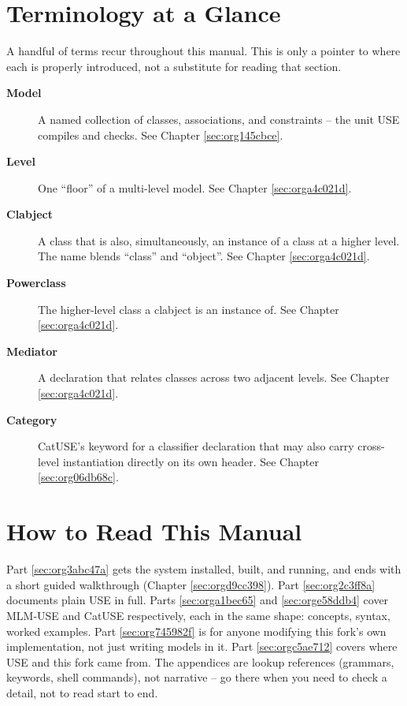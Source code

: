 \documentclass[11pt,twoside,a4paper]{book}
\begin{document}
\section{Terminology at a Glance}
\label{sec:orgeb539b8}
A handful of terms recur throughout this manual. This is only a
pointer to where each is properly introduced, not a substitute for
reading that section.


\begin{description}
\item[{\textbf{Model}}] A named collection of classes, associations, and
constraints -- the unit USE compiles and checks. See Chapter
\ref{sec:org145cbce}.
\item[{\textbf{Level}}] One ``floor'' of a multi-level model. See Chapter
\ref{sec:orga4c021d}.
\item[{\textbf{Clabject}}] A class that is also, simultaneously, an instance of a
class at a higher level. The name blends ``class'' and ``object''. See
Chapter \ref{sec:orga4c021d}.
\item[{\textbf{Powerclass}}] The higher-level class a clabject is an instance of.
See Chapter \ref{sec:orga4c021d}.
\item[{\textbf{Mediator}}] A declaration that relates classes across two adjacent
levels. See Chapter \ref{sec:orga4c021d}.
\item[{\textbf{Category}}] CatUSE's keyword for a classifier declaration that may
also carry cross-level instantiation directly on its own header. See
Chapter \ref{sec:org06db68c}.
\end{description}

\section{How to Read This Manual}
\label{sec:org5fa921c}
Part \ref{sec:org3abc47a} gets the system installed, built, and
running, and ends with a short guided walkthrough (Chapter
\ref{sec:orgd9cc398}). Part \ref{sec:org2c3ff8a} documents plain
USE in full. Parts \ref{sec:orga1bec65} and \ref{sec:orge58ddb4} cover MLM-USE
and CatUSE respectively, each in the same shape: concepts, syntax,
worked examples. Part \ref{sec:org745982f} is for anyone modifying this
fork's own implementation, not just writing models in it. Part
\ref{sec:orgc5ae712} covers where USE and this fork came from. The
appendices are lookup references (grammars, keywords, shell commands),
not narrative -- go there when you need to check a detail, not to read
start to end.
\end{document}

